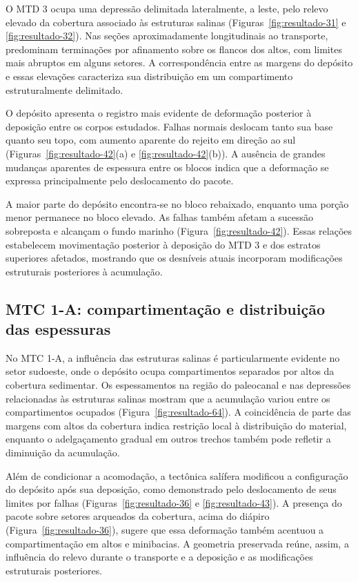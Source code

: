 O MTD 3 ocupa uma depressão delimitada lateralmente, a leste, pelo relevo elevado da cobertura associado às estruturas salinas (Figuras~\ref{fig:resultado-31} e \ref{fig:resultado-32}). Nas seções aproximadamente longitudinais ao transporte, predominam terminações por afinamento sobre os flancos dos altos, com limites mais abruptos em alguns setores. A correspondência entre as margens do depósito e essas elevações caracteriza sua distribuição em um compartimento estruturalmente delimitado.

O depósito apresenta o registro mais evidente de deformação posterior à deposição entre os corpos estudados. Falhas normais deslocam tanto sua base quanto seu topo, com aumento aparente do rejeito em direção ao sul (Figuras~\ref{fig:resultado-42}(a) e \ref{fig:resultado-42}(b)). A ausência de grandes mudanças aparentes de espessura entre os blocos indica que a deformação se expressa principalmente pelo deslocamento do pacote.

A maior parte do depósito encontra-se no bloco rebaixado, enquanto uma porção menor permanece no bloco elevado. As falhas também afetam a sucessão sobreposta e alcançam o fundo marinho (Figura~\ref{fig:resultado-42}). Essas relações estabelecem movimentação posterior à deposição do MTD 3 e dos estratos superiores afetados, mostrando que os desníveis atuais incorporam modificações estruturais posteriores à acumulação.

\subsection{MTC 1-A: compartimentação e distribuição das espessuras}\label{sec:6-2-2}

No MTC 1-A, a influência das estruturas salinas é particularmente evidente no setor sudoeste, onde o depósito ocupa compartimentos separados por altos da cobertura sedimentar. Os espessamentos na região do paleocanal e nas depressões relacionadas às estruturas salinas mostram que a acumulação variou entre os compartimentos ocupados (Figura~\ref{fig:resultado-64}). A coincidência de parte das margens com altos da cobertura indica restrição local à distribuição do material, enquanto o adelgaçamento gradual em outros trechos também pode refletir a diminuição da acumulação.

Além de condicionar a acomodação, a tectônica salífera modificou a configuração do depósito após sua deposição, como demonstrado pelo deslocamento de seus limites por falhas (Figuras~\ref{fig:resultado-36} e \ref{fig:resultado-43}). A presença do pacote sobre setores arqueados da cobertura, acima do diápiro (Figura~\ref{fig:resultado-36}), sugere que essa deformação também acentuou a compartimentação em altos e minibacias. A geometria preservada reúne, assim, a influência do relevo durante o transporte e a deposição e as modificações estruturais posteriores.

